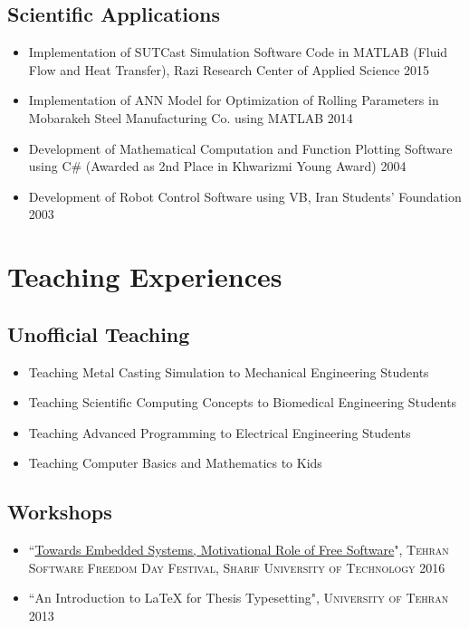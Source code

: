 \documentclass{cv}
\begin{document}
\subsection{Scientific Applications}

\begin{itemize}
\item
Implementation of SUTCast Simulation Software Code in MATLAB (Fluid Flow and Heat Transfer), Razi Research Center of Applied Science \hfill 2015
\item
Implementation of ANN Model for Optimization of Rolling Parameters in Mobarakeh Steel Manufacturing Co. using MATLAB \hfill 2014
\item
Development of Mathematical Computation and Function Plotting Software using C\# (Awarded as 2nd Place in Khwarizmi Young Award) \hfill 2004
\item
Development of Robot Control Software using VB, Iran Students' Foundation \hfill 2003

\end{itemize}



\section{Teaching Experiences}

\subsection{Unofficial Teaching}

\begin{itemize}
\item
Teaching Metal Casting Simulation to Mechanical Engineering Students
\item
Teaching Scientific Computing Concepts to Biomedical Engineering Students
\item
Teaching Advanced Programming to Electrical Engineering Students
\item
Teaching Computer Basics and Mathematics to Kids
\end{itemize}

\subsection{Workshops}


\begin{itemize}
\item
``\href{https://www.slideshare.net/tehsfd/embedded-system-70659214}{Towards Embedded Systems, Motivational Role of Free Software}", \textsc{Tehran Software Freedom Day Festival, Sharif University of Technology} \hfill 2016
\item
``An Introduction to \LaTeX{} for Thesis Typesetting", \textsc{University of Tehran} \hfill 2013
\end{itemize}
\end{document}
